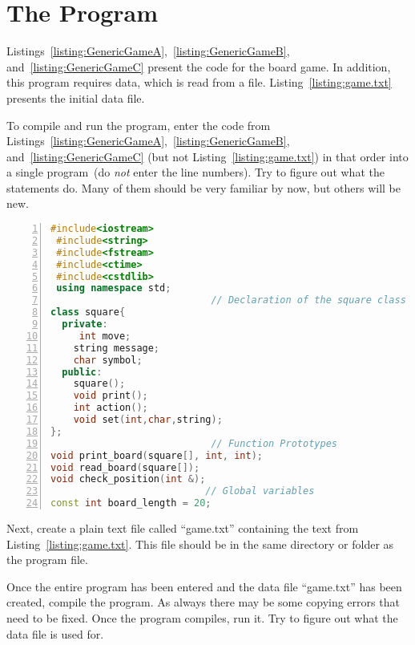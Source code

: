 \section{The Program}

Listings~\ref{listing:GenericGameA},~\ref{listing:GenericGameB}, and~\ref{listing:GenericGameC} present the code for the board game.  In addition, this program requires data, which is read from a file.  Listing~\ref{listing:game.txt} presents the initial data file.  


To compile and run the program, enter the code from Listings~\ref{listing:GenericGameA},~\ref{listing:GenericGameB}, and~\ref{listing:GenericGameC} (but not Listing~\ref{listing:game.txt}) in that order into a single program\ (do \emph{not} enter the line numbers).  Try to figure out what the statements do.  Many of them should be very familiar by now, but others will be new.

\begin{minipage}{\textwidth}
\begin{lstlisting}[language=C++,numbers = left,xleftmargin=4.0ex, basicstyle=\small, emph={move,message,symbol,board_length},emphstyle = \color{\mycolor}, 
showstringspaces=false,
caption = {Initial code for the Generic Board Game program, including the include statements, declaration of the \cf{square class}, prototypes for the other functions defined as part of the program, and a global constant called \codefont{board\_length}.},
label={listing:GenericGameA}]
 #include<iostream>
 #include<string>
 #include<fstream>
 #include<ctime>
 #include<cstdlib>
 using namespace std;
                            // Declaration of the square class
class square{
  private:
     int move;
    string message;
    char symbol;
  public:
    square();
    void print();
    int action();
    void set(int,char,string);
};
                            // Function Prototypes
void print_board(square[], int, int);
void read_board(square[]);
void check_position(int &);
                           // Global variables
const int board_length = 20;
\end{lstlisting}
\end{minipage}

Next, create a plain text file called ``game.txt'' containing the text from Listing~\ref{listing:game.txt}.  This file should be in the same directory or folder as the program file.

Once the entire program has been entered and the data file ``game.txt'' has been created, compile the program.  As always there may be some copying errors that need to be fixed.  Once the program compiles, run it.  Try to figure out what the data file is used for.

